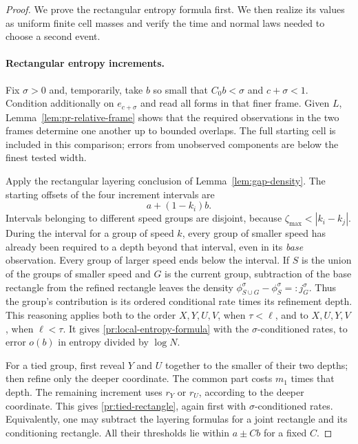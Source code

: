 \begin{proof}
We prove the rectangular entropy formula first. We then realize its
values as uniform finite cell masses and verify the time and normal
laws needed to choose a second event.

\paragraph{Rectangular entropy increments.}
Fix $\sigma>0$ and, temporarily, take $b$ so small that
$C_0b<\sigma$ and $c+\sigma<1$.
Condition additionally on $e_{c+\sigma}$ and read all forms in
that finer frame. Given $L$, Lemma~\ref{lem:pr-relative-frame}
shows that the required observations in the two frames determine
one another up to bounded overlaps. The full starting cell is
included in this comparison; errors from unobserved components
are below the finest tested width.

Apply the rectangular layering conclusion of
Lemma~\ref{lem:gap-density}. The starting offsets of the four
increment intervals are
\[
 a+(1-k_i)b.
\]
Intervals belonging to different speed groups are disjoint, because
$\zeta_{\max}<|k_i-k_j|$.
During the interval for a group of speed $k$, every group of smaller
speed has already been required to a depth beyond that interval,
even in its \emph{base} observation. Every group of larger speed
ends below the interval. If $S$ is the union of the groups of smaller
speed and $G$ is the current group, subtraction of the base rectangle from the refined
rectangle leaves the density
$\phi_{S\cup G}^{\sigma}-\phi_S^{\sigma}=:j_G^{\sigma}$.
Thus the group's contribution is its ordered conditional rate times
its refinement depth.
This reasoning applies both to the order $X,Y,U,V$, when
$\tau<\ell$, and to $X,U,Y,V$, when $\ell<\tau$.
It gives \eqref{pr:local-entropy-formula} with the
$\sigma$-conditioned rates, to error $o(b)$ in entropy divided by
$\log N$.

For a tied group, first reveal $Y$ and $U$ together to the smaller
of their two depths; then refine only the deeper coordinate. The
common part costs $m_1$ times that depth. The remaining
increment uses $r_Y$ or $r_U$, according to the deeper coordinate.
This gives \eqref{pr:tied-rectangle}, again first with
$\sigma$-conditioned rates.
Equivalently, one may subtract the layering formulas for a joint
rectangle and its conditioning rectangle. All their thresholds lie
within $a\pm Cb$ for a fixed $C$.


\end{proof}
